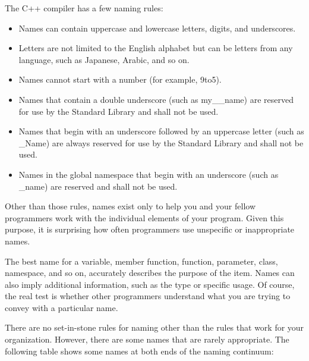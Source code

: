 
The C++ compiler has a few naming rules:

\begin{itemize}
\item
Names can contain uppercase and lowercase letters, digits, and underscores.

\item
Letters are not limited to the English alphabet but can be letters from any language, such as Japanese, Arabic, and so on.

\item
Names cannot start with a number (for example, 9to5).

\item
Names that contain a double underscore (such as my\_\_name) are reserved for use by the Standard Library and shall not be used.

\item
Names that begin with an underscore followed by an uppercase letter (such as \_Name) are always reserved for use by the Standard Library and shall not be used.

\item
Names in the global namespace that begin with an underscore (such as \_name) are reserved and shall not be used.
\end{itemize}

Other than those rules, names exist only to help you and your fellow programmers work with the individual elements of your program. Given this purpose, it is surprising how often programmers use unspecific or inappropriate names.


The best name for a variable, member function, function, parameter, class, namespace, and so on, accurately describes the purpose of the item. Names can also imply additional information, such as the type or specific usage. Of course, the real test is whether other programmers understand what you are trying to convey with a particular name.

There are no set-in-stone rules for naming other than the rules that work for your organization. However, there are some names that are rarely appropriate. The following table shows some names at both ends of the naming continuum:

